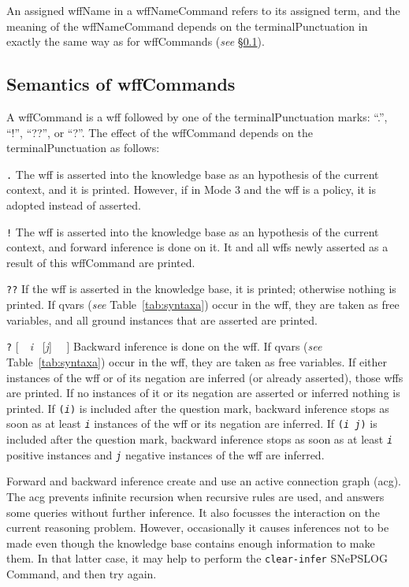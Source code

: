 \documentclass{book}
\begin{document}
An assigned wffName in a wffNameCommand refers to its assigned term,
and the meaning of the wffNameCommand depends on the
terminalPunctuation in exactly the same way as for wffCommands
(\textit{see} \S\ref{sec:wffcommands}).

\subsection{Semantics of wffCommands}\label{sec:wffcommands}
A wffCommand is a wff followed by one of the
terminalPunctuation marks: ``.'', ``!'', ``??'', or ``?''.  The effect
of the wffCommand depends on the
terminalPunctuation as follows:
\begin{description}
\item \texttt{.} The wff is asserted into the knowledge base as an
  hypothesis of the current context, and it is printed.  However, if in Mode 3
  and the wff is a policy, it is adopted instead of asserted.
\item \texttt{!} The wff is asserted into the knowledge base as an
  hypothesis of the current context, and forward inference is done on
  it.  It and all wffs newly asserted as a result of this wffCommand
  are printed.
\item \texttt{??} If the wff is asserted in the knowledge base, it is
  printed; otherwise nothing is printed.  If qvars (\textit{see}
  Table~\ref{tab:syntaxa}) occur in the wff, they are taken as free
  variables, and all ground instances that are asserted are printed.
\item \texttt{?} [~\oparen ~\textit{i}~ [\textit{j}]~ \cparen~]
  Backward inference is done on the wff.  If qvars (\textit{see}
  Table~\ref{tab:syntaxa}) occur in the wff, they are taken as free
  variables.  If either instances of the wff or of its negation are
  inferred (or already asserted), those wffs are printed.  If no
  instances of it or its negation are asserted or inferred nothing is
  printed.  If \texttt{(\textit{i})} is included after the question
  mark, backward inference stops as soon as at least
  \texttt{\textit{i}} instances of the wff or its negation are
  inferred.  If \texttt{(\textit{i} \textit{j})} is included after
  the question mark, backward inference stops as soon as at least
  \texttt{\textit{i}} positive instances and \texttt{\textit{j}}
  negative instances of the wff are inferred.
\end{description}

Forward and backward inference create and use an active connection
graph (acg).  The acg prevents infinite
recursion when recursive rules are used, and answers some queries
without further inference.  It also focusses the interaction on the
current reasoning problem.  However, occasionally it causes inferences
not to be made even though the knowledge base contains enough
information to make them.  In that latter case, it may help to perform
the \texttt{clear-infer} SNePSLOG Command, and then try again.
\end{document}
